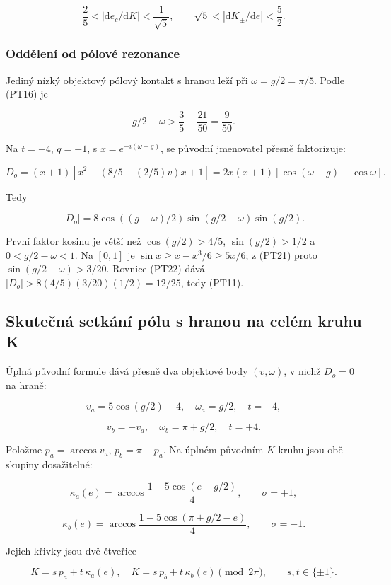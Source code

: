 \documentclass[11pt,a4paper]{article}
\theoremstyle{remark}\newtheorem{remark}[theorem]{Poznámka}
\numberwithin{equation}{section}
\begin{document}
\[
\frac25<|\mathrm de_c/\mathrm dK|<\frac1{\sqrt5},
\qquad
\sqrt5<|\mathrm dK_\pm/\mathrm de|<\frac52.
\tag{PT20}
\]

\subsubsection{Oddělení od pólové rezonance}\label{oddux11blenuxed-od-puxf3lovuxe9-rezonance}

Jediný nízký objektový pólový kontakt s hranou leží při
\(\omega=g/2=\pi/5\). Podle (PT16) je

\[
g/2-\omega>\frac35-\frac{21}{50}=\frac9{50}.
\tag{PT21}
\]

Na \(t=-4\), \(q=-1\), s \(x=e^{-i(\omega-g)}\), se původní
jmenovatel přesně faktorizuje:

\[
D_o=(x+1)[x^2-(8/5+(2/5)v)x+1]
=2x(x+1)[\cos(\omega-g)-\cos\omega].
\]

Tedy

\[
|D_o|=
8\cos((g-\omega)/2)
\sin(g/2-\omega)\sin(g/2).
\tag{PT22}
\]

První faktor kosinu je větší než \(\cos(g/2)>4/5\),
\(\sin(g/2)>1/2\) a
\(0<g/2-\omega<1\).
Na \([0,1]\) je \(\sin x\ge x-x^3/6\ge5x/6\);
z (PT21) proto \(\sin(g/2-\omega)>3/20\).
Rovnice (PT22) dává
\(|D_o|>8(4/5)(3/20)(1/2)=12/25\), tedy (PT11).

\subsection{Skutečná setkání pólu s hranou na celém kruhu K}\label{skuteux10dnuxe1-setkuxe1nuxed-puxf3lu-s-hranou-na-celuxe9m-kruhu-k}

Úplná původní formule dává přesně dva objektové body
\((v,\omega)\), v nichž \(D_o=0\) na hraně:

\[
v_a=5\cos(g/2)-4,\quad \omega_a=g/2,\quad t=-4,
\]

\[
v_b=-v_a,\quad \omega_b=\pi+g/2,\quad t=+4.
\tag{PT23}
\]

Položme \(p_a=\arccos v_a\), \(p_b=\pi-p_a\).
Na úplném původním \(K\)-kruhu jsou obě skupiny dosažitelné:

\[
\kappa_a(e)=
\arccos\frac{1-5\cos(e-g/2)}4,\qquad \sigma=+1,
\]

\[
\kappa_b(e)=
\arccos\frac{1-5\cos(\pi+g/2-e)}4,\qquad \sigma=-1.
\tag{PT24}
\]

Jejich křivky jsou dvě čtveřice

\[
\boxed{
K=s\,p_a+t\,\kappa_a(e),\quad
K=s\,p_b+t\,\kappa_b(e)
\pmod{2\pi},\qquad s,t\in\{\pm1\}.
}
\tag{PT25}
\]
\end{document}
